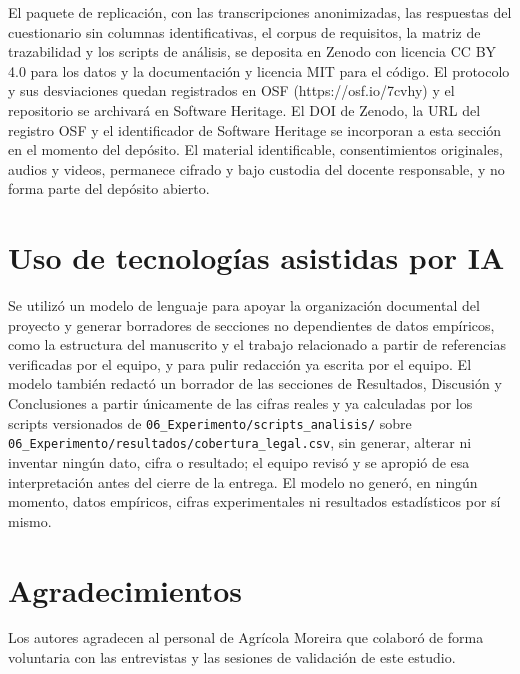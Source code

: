 \documentclass[pdflatex,sn-mathphys-num]{sn-jnl}
\begin{document}
El paquete de replicaci\'on, con las transcripciones anonimizadas, las respuestas del cuestionario sin columnas identificativas, el corpus de requisitos, la matriz de trazabilidad y los scripts de an\'alisis, se deposita en Zenodo con licencia CC BY 4.0 para los datos y la documentaci\'on y licencia MIT para el c\'odigo. El protocolo y sus desviaciones quedan registrados en OSF (https://osf.io/7cvhy) y el repositorio se archivar\'a en Software Heritage. El DOI de Zenodo, la URL del registro OSF y el identificador de Software Heritage se incorporan a esta secci\'on en el momento del dep\'osito. El material identificable, consentimientos originales, audios y videos, permanece cifrado y bajo custodia del docente responsable, y no forma parte del dep\'osito abierto.

\section*{Uso de tecnolog\'ias asistidas por IA}

Se utiliz\'o un modelo de lenguaje para apoyar la organizaci\'on documental del proyecto y generar borradores de secciones no dependientes de datos emp\'iricos, como la estructura del manuscrito y el trabajo relacionado a partir de referencias verificadas por el equipo, y para pulir redacci\'on ya escrita por el equipo. El modelo tambi\'en redact\'o un borrador de las secciones de Resultados, Discusi\'on y Conclusiones a partir \'unicamente de las cifras reales y ya calculadas por los scripts versionados de \texttt{06\_Experimento/scripts\_analisis/} sobre \texttt{06\_Experimento/resultados/cobertura\_legal.csv}, sin generar, alterar ni inventar ning\'un dato, cifra o resultado; el equipo revis\'o y se apropi\'o de esa interpretaci\'on antes del cierre de la entrega. El modelo no gener\'o, en ning\'un momento, datos emp\'iricos, cifras experimentales ni resultados estad\'isticos por s\'i mismo.

\section*{Agradecimientos}

Los autores agradecen al personal de Agr\'icola Moreira que colabor\'o de forma voluntaria con las entrevistas y las sesiones de validaci\'on de este estudio.


\end{document}
